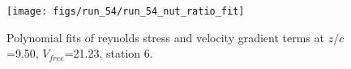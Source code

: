 \begin{figure}[H]
\centering
\texttt{[image: figs/run\_54/run\_54\_nut\_ratio\_fit]}
\caption{Polynomial fits of reynolds stress and velocity gradient terms at $z/c$=9.50, $V_{free}$=21.23, station 6.}
\label{fig:run_54_nut_ratio_fit}
\end{figure}


